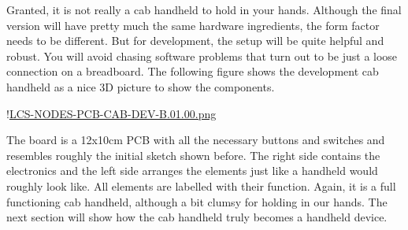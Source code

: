 Granted, it is not really a cab handheld to hold in your hands. Although the final version will have pretty much the same hardware ingredients, the form factor needs to be different. But for development, the setup will be quite helpful and robust. You will avoid chasing software problems that turn out to be just a loose connection on a breadboard. The following figure shows the development cab handheld as a nice 3D picture to show the components.

!\href{./Boards/LCS-NODES-PCB-CAB-DEV-B.01.00.png }{LCS-NODES-PCB-CAB-DEV-B.01.00.png}

The board is a 12x10cm PCB with all the necessary buttons and switches and resembles roughly the initial sketch shown before. The right side contains the electronics and the left side arranges the elements just like a handheld would roughly look like. All elements are labelled with their function. Again, it is a full functioning cab handheld, although a bit clumsy for holding in our hands. The next section will show how the cab handheld truly becomes a handheld device.
